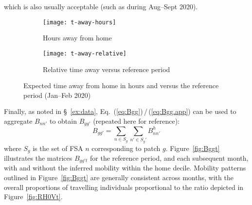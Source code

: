 which is also usually acceptable (such as during Aug--Sept 2020).
\begin{figure}
  \centering
  \begin{subfigure}{0.4\linewidth}
    \texttt{[image: t-away-hours]}
    \caption{Hours away from home}
    \label{fig:W-hours}
  \end{subfigure}
  \begin{subfigure}{0.4\linewidth}
    \texttt{[image: t-away-relative]}
    \caption{Relative time away versus reference period}
    \label{fig:W-relative}
  \end{subfigure}
  \caption{Expected time away from home in hours and versus the reference period (Jan--Feb 2020)}
  \label{fig:W}
\end{figure}
\par
Finally, as noted in \S~\ref{ex:data}, Eq.~(\ref{eq:Bgg})\,/\,(\ref{eq:Bgg.app})
can be used to aggregate $B_{nn'}$ to obtain $B_{gg'}$ (repeated here for reference):
\begin{equation}\label{eq:Bgg.app}
  B_{gg'} = \sum_{n \in S_g}\sum_{n' \in S_g'} B^h_{nn'}
\end{equation}
where $S_{g}$ is the set of FSA $n$ corresponding to patch $g$.
Figure~\ref{fig:Bggt} illustrates the matrices $B_{gg't}$
for the reference period, and each subsequent month,
with and without the inferred mobility within the home decile.
Mobility patterns outlined in Figure~\ref{fig:Bggt} are generally consistent across months,
with the overall proportions of travelling individuals
proportional to the ratio depicted in Figure~\ref{fig:RH0Vt}.
